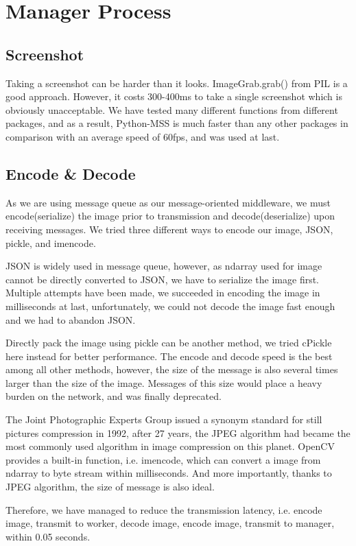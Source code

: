 \documentclass[runningheads]{llncs}
\begin{document}
\section{Manager Process}
\subsection{Screenshot}
Taking a screenshot can be harder than it looks. 
ImageGrab.grab() from PIL is a good approach. However, 
it costs 300-400ms to take a single screenshot which is 
obviously unacceptable. We have tested many different functions 
from different packages, and as a result, Python-MSS is much 
faster than any other packages in comparison with an 
average speed of 60fps, and was used at last.

\subsection{Encode \& Decode}
As we are using message queue as our message-oriented 
middleware, we must encode(serialize) the image prior to 
transmission and decode(deserialize) upon receiving messages. 
We tried three different ways to encode our image, JSON, 
pickle, and imencode. 

JSON is widely used in message queue, however, as ndarray 
used for image cannot be directly converted to JSON, we have 
to serialize the image first. Multiple attempts have been 
made, we succeeded in encoding the image in milliseconds at last, 
unfortunately, we could not decode the image fast enough 
and we had to abandon JSON. 

Directly pack the image using pickle can be another method, 
we tried cPickle here instead for better performance. The 
encode and decode speed is the best among all other methods, 
however, the size of the message is also several times 
larger than the size of the image. Messages of this size 
would place a heavy burden on the network, and was finally 
deprecated. 

The Joint Photographic Experts Group issued a synonym 
standard for still pictures compression in 1992, after 
27 years, the JPEG algorithm had became the most commonly 
used algorithm in image compression on this planet. OpenCV 
provides a built-in function, i.e. imencode, which can 
convert a image from ndarray to byte stream within 
milliseconds. And more importantly, thanks to JPEG 
algorithm, the size of message is also ideal. 

Therefore, we have managed to reduce the transmission 
latency, i.e. encode image, transmit to worker, decode 
image, encode image, transmit to manager, within 0.05 seconds.
\end{document}
